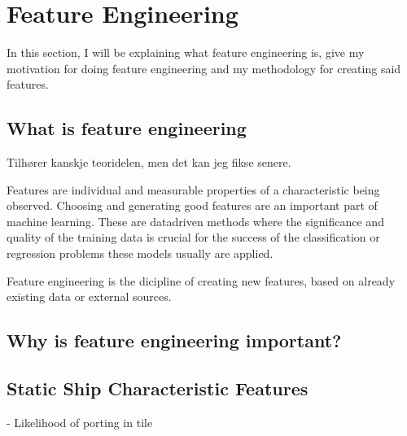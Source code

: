 \chapter[Feature Engineering]{Feature Engineering}
\label{chp:labelkey}
\begin{info}
\end{info}

In this section, I will be explaining what feature engineering is, give my motivation for doing feature engineering and my methodology for creating said features. 
\section{What is feature engineering}
\begin{info}{}
	Tilhører kanskje teoridelen, men det kan jeg fikse senere. 
\end{info}

Features are individual and measurable properties of a characteristic being observed. Choosing and generating good features are an important part of machine learning. These are datadriven methods where the significance and quality of the training data is crucial for the success of the classification or regression problems these models usually are applied. 

Feature engineering is the dicipline of creating new features, based on already existing data or external sources. 

\section{Why is feature engineering important?}
\begin{info}{}
\end{info}

\section{Static Ship Characteristic Features}
\begin{info}{}
\end{info}

- Likelihood of porting in tile





